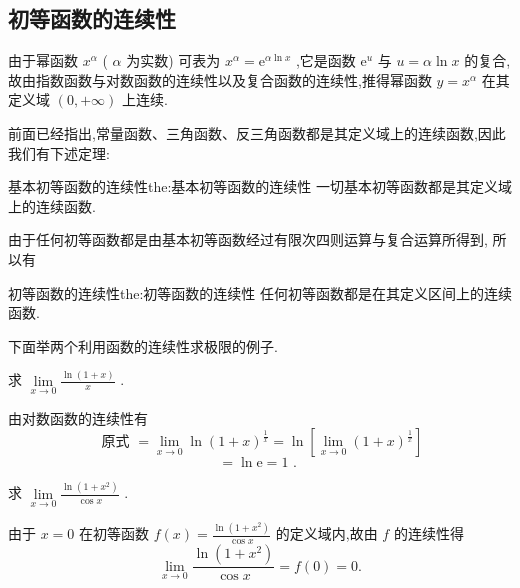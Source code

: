 \subsection{初等函数的连续性}

由于幂函数 \({x}^{\alpha }\) ( \(\alpha\) 为实数) 可表为 \({x}^{\alpha } = {\mathrm{e}}^{\alpha \ln x}\) ,它是函数 \({\mathrm{e}}^{u}\) 与 \(u = \alpha \ln x\) 的复合,故由指数函数与对数函数的连续性以及复合函数的连续性,推得幂函数 \(y = {x}^{\alpha }\) 在其定义域 \(\left( {0, + \infty }\right)\) 上连续.

前面已经指出,常量函数、三角函数、反三角函数都是其定义域上的连续函数,因此我们有下述定理:

\begin{theorem}{基本初等函数的连续性}{the:基本初等函数的连续性}
一切基本初等函数都是其定义域上的连续函数.
\end{theorem}


由于任何初等函数都是由基本初等函数经过有限次四则运算与复合运算所得到, 所以有

\begin{theorem}{初等函数的连续性}{the:初等函数的连续性}
任何初等函数都是在其定义区间上的连续函数.
\end{theorem}


下面举两个利用函数的连续性求极限的例子.

\begin{example}
求 \(\mathop{\lim }\limits_{{x \rightarrow  0}}\frac{\ln \left( {1 + x}\right) }{x}\) .
\end{example}


\begin{solution}
由对数函数的连续性有
\[
\text{ 原式 } = \mathop{\lim }\limits_{{x \rightarrow  0}}\ln {\left( 1 + x\right) }^{\frac{1}{x}} = \ln \left\lbrack  {\mathop{\lim }\limits_{{x \rightarrow  0}}{\left( 1 + x\right) }^{\frac{1}{x}}}\right\rbrack
\]
\[
= \ln \mathrm{e} = 1\text{ . }
\]
\end{solution}

\begin{example}
求 \(\mathop{\lim }\limits_{{x \rightarrow  0}}\frac{\ln \left( {1 + {x}^{2}}\right) }{\cos x}\) .
\end{example}


\begin{solution}
由于 \(x = 0\) 在初等函数 \(f\left( x\right)  = \frac{\ln \left( {1 + {x}^{2}}\right) }{\cos x}\) 的定义域内,故由 \(f\) 的连续性得
\[
\mathop{\lim }\limits_{{x \rightarrow  0}}\frac{\ln \left( {1 + {x}^{2}}\right) }{\cos x} = f\left( 0\right)  = 0.
\]
\end{solution}

